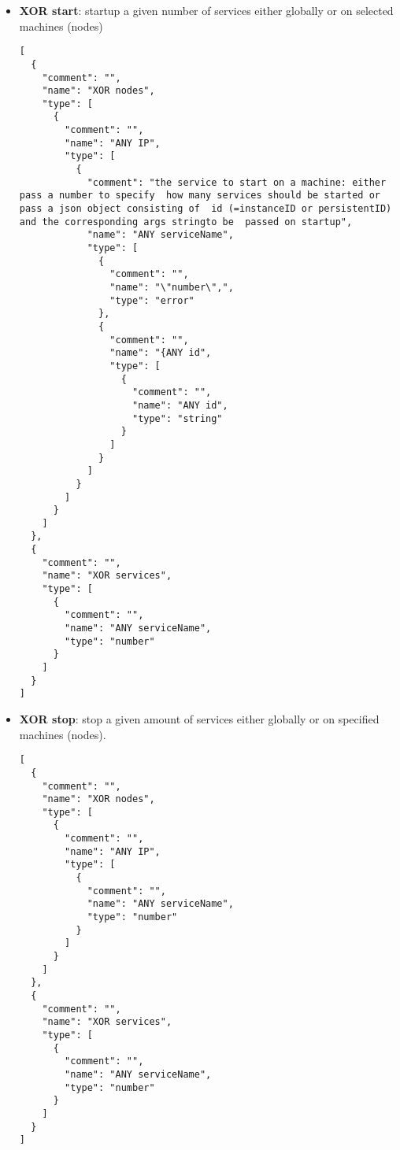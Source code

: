 \begin{itemize}
\begin{lstlisting}
[
  {
    "comment": "", 
    "name": "XOR nodes", 
    "type": [
      {
        "comment": "", 
        "name": "ANY IP", 
        "type": [
          "string"
        ]
      }
    ]
  }, 
  {
    "comment": "", 
    "name": "XOR services", 
    "type": [
      "string"
    ]
  }
]
\end{lstlisting}
    \item \textbf{XOR start}: startup a given number of services either globally or on selected machines (nodes)
\begin{lstlisting}
[
  {
    "comment": "", 
    "name": "XOR nodes", 
    "type": [
      {
        "comment": "", 
        "name": "ANY IP", 
        "type": [
          {
            "comment": "the service to start on a machine: either pass a number to specify  how many services should be started or pass a json object consisting of  id (=instanceID or persistentID) and the corresponding args stringto be  passed on startup", 
            "name": "ANY serviceName", 
            "type": [
              {
                "comment": "", 
                "name": "\"number\",", 
                "type": "error"
              }, 
              {
                "comment": "", 
                "name": "{ANY id", 
                "type": [
                  {
                    "comment": "", 
                    "name": "ANY id", 
                    "type": "string"
                  }
                ]
              }
            ]
          }
        ]
      }
    ]
  }, 
  {
    "comment": "", 
    "name": "XOR services", 
    "type": [
      {
        "comment": "", 
        "name": "ANY serviceName", 
        "type": "number"
      }
    ]
  }
]
\end{lstlisting}
    \item \textbf{XOR stop}: stop a given amount of services either globally or on specified machines (nodes).
\begin{lstlisting}
[
  {
    "comment": "", 
    "name": "XOR nodes", 
    "type": [
      {
        "comment": "", 
        "name": "ANY IP", 
        "type": [
          {
            "comment": "", 
            "name": "ANY serviceName", 
            "type": "number"
          }
        ]
      }
    ]
  }, 
  {
    "comment": "", 
    "name": "XOR services", 
    "type": [
      {
        "comment": "", 
        "name": "ANY serviceName", 
        "type": "number"
      }
    ]
  }
]
\end{lstlisting}
  \end{itemize}


